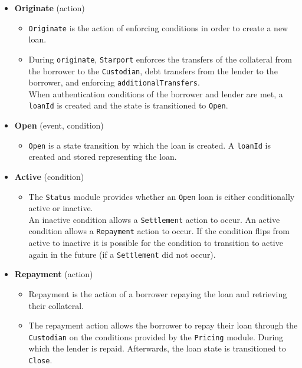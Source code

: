 \documentclass[12pt]{article}
\begin{document}
\begin{itemize}
	\item \textbf{Originate} (action)
	\begin{itemize}
		\item \texttt{Originate} is the action of enforcing conditions in order to create a new loan.

		\item During \texttt{originate}, \texttt{Starport} enforces the transfers of the collateral from the borrower to the \texttt{Custodian}, debt transfers from the lender to the borrower, and enforcing \texttt{additionalTransfers}.\\
			When authentication conditions of the borrower and lender are met, a \texttt{loanId} is created and the state is transitioned to \texttt{Open}.
	\end{itemize}
	
	\item \textbf{Open} (event, condition)
	\begin{itemize}
		\item \texttt{Open} is a state transition by which the loan is created. A \texttt{loanId} is created and stored representing the loan. 
	\end{itemize}
	
	\item \textbf{Active} (condition)
	\begin{itemize}
		\item The \texttt{Status} module provides whether an \texttt{Open} loan is either conditionally active or inactive.\\
			An inactive condition allows a \texttt{Settlement} action to occur. An active condition allows a \texttt{Repayment} action to occur. If the condition flips from active to inactive it is possible for the condition to transition to active again in the future (if a \texttt{Settlement} did not occur).
	\end{itemize}
	
	\item \textbf{Repayment} (action)
	\begin{itemize}
		\item Repayment is the action of a borrower repaying the loan and retrieving their collateral.
		\item The repayment action allows the borrower to repay their loan through the \texttt{Custodian} on the conditions provided by the  \texttt{Pricing} module. During which the lender is repaid. Afterwards, the loan state is transitioned to \texttt{Close}.
	\end{itemize}
	

\end{itemize}
\end{document}
